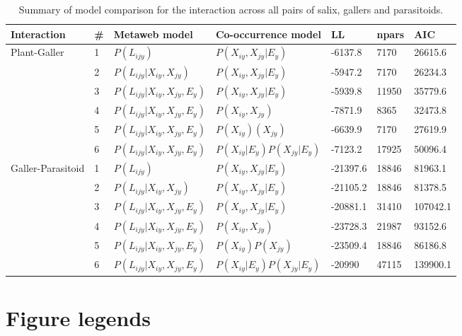 \documentclass[12pt]{article}
\begin{document}
\begin{landscape}
\begin{table}[]
\centering
\caption{Summary of model comparison for the interaction across all pairs of salix, gallers and parasitoids.}
\begin{tabular}{lllllll}
\hline
	Interaction & \# & Metaweb model & Co-occurrence model & LL & npars & AIC \\ \hline
	Plant-Galler & 1 & $P(L_{ijy})$ & $P(X_{iy},X_{jy}|E_y)$ & -6137.8 & 7170 & 26615.6 \\
	 & 2 & $P(L_{ijy}|X_{iy},X_{jy})$ & $P(X_{iy},X_{jy}|E_y)$ & -5947.2 & 7170 & 26234.3 \\
	 & 3 & $P(L_{ijy} | X_{iy}, X_{jy}, E_y)$ & $P(X_{iy},X_{jy}|E_y)$ & -5939.8 & 11950 & 35779.6 \\
	 & 4 & $P(L_{ijy} | X_{iy}, X_{jy}, E_y)$ & $P(X_{iy},X_{jy})$ & -7871.9 & 8365 & 32473.8 \\
	 & 5 & $P(L_{ijy} | X_{iy}, X_{jy}, E_y)$ & $P(X_{iy})(X_{jy})$ & -6639.9 & 7170 & 27619.9 \\
	 & 6 & $P(L_{ijy} | X_{iy}, X_{jy}, E_y)$ & $P(X_{iy}|E_y)P(X_{jy}|E_y)$ & -7123.2 & 17925 & 50096.4 \\ \hline
	Galler-Parasitoid & 1 & $P(L_{ijy})$ & $P(X_{iy},X_{jy}|E_y)$ & -21397.6 & 18846 & 81963.1 \\
	 & 2 & $P(L_{ijy} | X_{iy}, X_{jy})$ & $P(X_{iy},X_{jy}|E_y)$ & -21105.2 & 18846 & 81378.5 \\
	 & 3 & $P(L_{ijy} | X_{iy}, X_{jy}, E_y)$ & $P(X_{iy},X_{jy}|E_y)$ & -20881.1 & 31410 & 107042.1 \\
	 & 4 & $P(L_{ijy} | X_{iy}, X_{jy}, E_y)$ & $P(X_{iy},X_{jy})$ & -23728.3 & 21987 & 93152.6 \\
	 & 5 & $P(L_{ijy} | X_{iy}, X_{jy}, E_y)$ & $P(X_{iy})P(X_{jy})$ & -23509.4 & 18846 & 86186.8 \\
	 & 6 & $P(L_{ijy} | X_{iy}, X_{jy}, E_y)$ & $P(X_{iy}|E_y)P(X_{jy}|E_y)$ & -20990 & 47115 & 139900.1 \\
\hline
\end{tabular}
\end{table}
\end{landscape}

\newpage
\section*{Figure legends}

\end{document}
